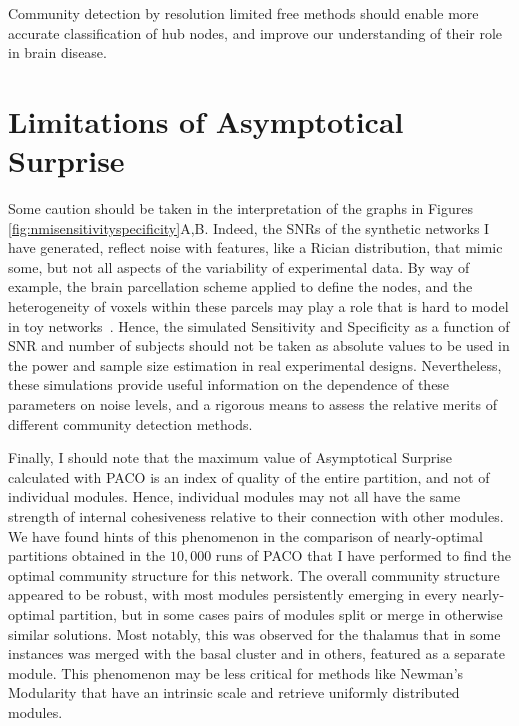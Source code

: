 Community detection by resolution limited free methods should enable more accurate classification of hub nodes, and improve our understanding of their role in brain disease.


\section{Limitations of Asymptotical Surprise}
Some caution should be taken in the interpretation of the graphs in Figures \ref{fig:nmisensitivityspecificity}A,B.
Indeed, the SNRs of the synthetic networks I have generated, reflect noise with features, like a Rician distribution, that mimic some, but not all aspects of the variability of experimental data.
By way of example, the brain parcellation scheme applied to define the nodes, and the heterogeneity of voxels within these parcels may play a role that is hard to model in toy networks~\cite{fornito2010}.
Hence, the simulated Sensitivity and Specificity as a function of SNR and number of subjects should not be taken as absolute values to be used in the power and sample size estimation in real experimental designs.
Nevertheless, these simulations provide useful information on the dependence of these parameters on noise levels, and a rigorous means to assess the relative merits of different community detection methods.

Finally, I should note that the maximum value of Asymptotical Surprise calculated with PACO is an index of quality of the entire partition, and not of individual modules.
Hence, individual modules may not all have the same strength of internal cohesiveness relative to their connection with other modules.
We have found hints of this phenomenon in the comparison of nearly-optimal partitions obtained in the $10,000$ runs of PACO that I have performed to find the optimal community structure for this network.
The overall community structure appeared to be robust, with most modules persistently emerging in every nearly-optimal partition, but in some cases pairs of modules split or merge in otherwise similar solutions.
Most notably, this was observed for the thalamus that in some instances was merged with the basal cluster and in others, featured as a separate module.
This phenomenon may be less critical for methods like Newman's Modularity that have an intrinsic scale and retrieve uniformly distributed modules.

